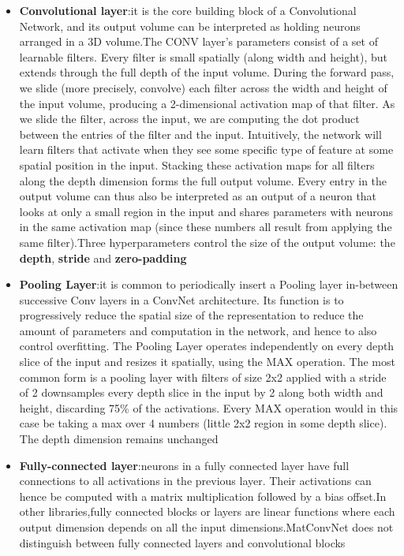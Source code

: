 \documentclass[]{report}
\begin{document}
\begin{itemize}

\item \textbf{Convolutional layer}:it is the core building block of a Convolutional Network, and its output volume can be interpreted as holding neurons arranged in a 3D volume.The CONV layer's parameters consist of a set of learnable filters. Every filter is small spatially (along width and height), but extends through the full depth of the input volume. During the forward pass, we slide (more precisely, convolve) each filter across the width and height of the input volume, producing a 2-dimensional activation map of that filter. As we slide the filter, across the input, we are computing the dot product between the entries of the filter and the input. Intuitively, the network will learn filters that activate when they see some specific type of feature at some spatial position in the input. Stacking these activation maps for all filters along the depth dimension forms the full output volume. Every entry in the output volume can thus also be interpreted as an output of a neuron that looks at only a small region in the input and shares parameters with neurons in the same activation map (since these numbers all result from applying the same filter).Three hyperparameters control the size of the output volume: the \textbf{depth}, \textbf{stride} and \textbf{zero-padding}

\item \textbf{Pooling Layer}:it is common to periodically insert a Pooling layer in-between successive Conv layers in a ConvNet architecture. Its function is to progressively reduce the spatial size of the representation to reduce the amount of parameters and computation in the network, and hence to also control overfitting. The Pooling Layer operates independently on every depth slice of the input and resizes it spatially, using the MAX operation. The most common form is a pooling layer with filters of size 2x2 applied with a stride of 2 downsamples every depth slice in the input by 2 along both width and height, discarding 75\% of the activations. Every MAX operation would in this case be taking a max over 4 numbers (little 2x2 region in some depth slice). The depth dimension remains unchanged

\item \textbf{Fully-connected layer}:neurons in a fully connected layer have full connections to all activations in the previous layer. Their activations can hence be computed with a matrix multiplication followed by a bias offset.In other libraries,fully connected blocks or layers are linear functions where each output dimension depends on all the input dimensions.MatConvNet does not distinguish between fully connected layers and convolutional blocks


\end{itemize}
\end{document}
